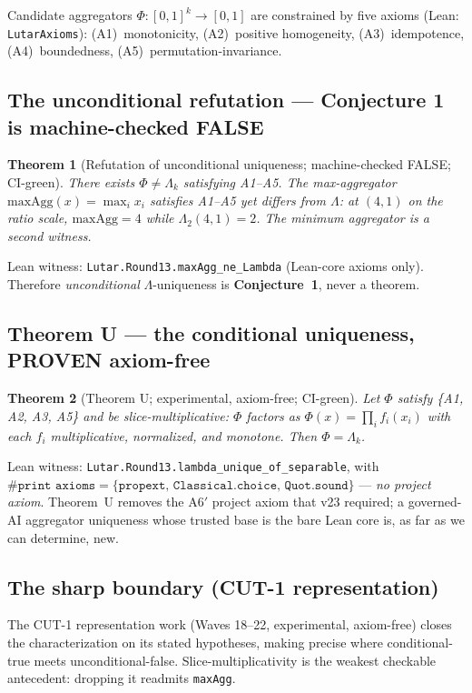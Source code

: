 \documentclass[11pt,letterpaper]{article}
\newtheorem{theorem}{Theorem}[section]
\theoremstyle{definition}
\newcommand{\Lam}{\Lambda}
\newcommand{\Ucoreaxioms}{\{\texttt{propext},\,\texttt{Classical.choice},\,\texttt{Quot.sound}\}}
\begin{document}
Candidate aggregators $\Phi:[0,1]^k\to[0,1]$ are constrained by five axioms
(Lean: \texttt{LutarAxioms}): (A1)~monotonicity, (A2)~positive homogeneity,
(A3)~idempotence, (A4)~boundedness, (A5)~permutation-invariance.

\subsection{The unconditional refutation --- Conjecture 1 is machine-checked FALSE}
\begin{theorem}[Refutation of unconditional uniqueness; machine-checked FALSE; CI-green]
There exists $\Phi\ne\Lam_k$ satisfying A1--A5. The max-aggregator
$\mathrm{maxAgg}(x)=\max_i x_i$ satisfies A1--A5 yet differs from $\Lam$: at
$(4,1)$ on the ratio scale, $\mathrm{maxAgg}=4$ while $\Lam_2(4,1)=2$. The
minimum aggregator is a second witness.
\end{theorem}
\noindent Lean witness: \texttt{Lutar.Round13.maxAgg\_ne\_Lambda} (Lean-core
axioms only). Therefore \emph{unconditional} $\Lam$-uniqueness is
\textbf{Conjecture~1}, never a theorem.

\subsection{Theorem U --- the conditional uniqueness, PROVEN axiom-free}
\begin{theorem}[Theorem U; experimental, axiom-free; CI-green]\label{thm:U}
Let $\Phi$ satisfy \{A1, A2, A3, A5\} and be \emph{slice-multiplicative}: $\Phi$
factors as $\Phi(x)=\prod_i f_i(x_i)$ with each $f_i$ multiplicative, normalized,
and monotone. Then $\Phi=\Lam_k$.
\end{theorem}
\noindent Lean witness: \texttt{Lutar.Round13.lambda\_unique\_of\_separable}, with
$\texttt{\#print axioms} = \Ucoreaxioms$ --- \emph{no project axiom}. Theorem~U
removes the A6$'$ project axiom that v23 required; a governed-AI aggregator
uniqueness whose trusted base is the bare Lean core is, as far as we can
determine, new.

\subsection{The sharp boundary (CUT-1 representation)}
The CUT-1 representation work (Waves 18--22, experimental, axiom-free) closes the
characterization on its stated hypotheses, making precise where conditional-true
meets unconditional-false. Slice-multiplicativity is the weakest checkable
antecedent: dropping it readmits \texttt{maxAgg}.
\end{document}
